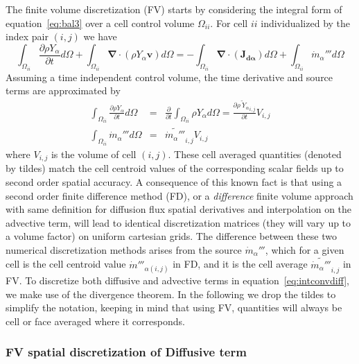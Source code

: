 \documentclass[12pt]{article}
\begin{document}
The finite volume discretization (FV) starts by considering the integral form of equation~\eqref{eq:bal3} over a cell control volume $\Omega_{ii}$. For
cell $ii$ individualized by the index pair $(i,j)$ we have
%
\begin{equation}
 \int_{\Omega_{ii}} {\frac{\partial \rho Y_\alpha}{\partial t}} d \Omega + \int_{\Omega_{ii}} { \boldsymbol{\nabla} \cdot  \left(  \rho Y_\alpha \mathbf{v} \right)
      } d \Omega  = -\int_{\Omega_{ii}} { \boldsymbol{\nabla} \cdot \left(  \mathbf{J_{d \alpha}}  \right)  } d \Omega + \int_{\Omega_{ii}} { \dot{m}_\alpha''' } d \Omega \label{eq:intconvdiff}
\end{equation}
%
Assuming a time independent control volume, the time derivative and source terms are approximated by
%
\begin{eqnarray}
  \int_{\Omega_{ii}} {\frac{\partial \rho Y_\alpha}{\partial t}} d \Omega & = & \frac{\partial}{\partial t} \int_{\Omega_{ii}} {\rho Y_\alpha} d \Omega
  = \frac{\partial \widetilde{\rho \: Y_\alpha }_{i,j}}{\partial t} V_{i,j} \\
  \int_{\Omega_{ii}} { \dot{m}_\alpha''' } d \Omega & = & \widetilde{ \dot{m}_\alpha''' }_{i,j} V_{i,j} \label{eq:intcons}
\end{eqnarray}
%
where $V_{i,j}$ is the volume of cell $(i,j)$. These cell averaged quantities (denoted by tildes) match the cell centroid values of the corresponding scalar fields up to second order spatial accuracy. A consequence of this known fact is that using a second order finite difference method (FD), or a \textit{difference} finite volume approach with same definition
 for diffusion flux spatial derivatives and interpolation on the advective term, will lead to identical discretization matrices (they will vary up to a volume factor) on uniform cartesian grids. The difference between these two numerical discretization methods arises from the source $\dot{m}_\alpha''' $, which for a given cell is the cell centroid value $\dot{m}'''_{\alpha (i,j)}$ in FD, and it is the cell average $ \widetilde{ \dot{m}_\alpha''' }_{i,j}$ in FV. To discretize both diffusive and advective terms in equation~\eqref{eq:intconvdiff}, we make use of the divergence theorem. In the following we drop the tildes to simplify the notation, keeping in mind that using FV, quantities will always be cell or face averaged where it corresponds.

\subsubsection*{FV spatial discretization of Diffusive term} \label{Sec:FVdiff}
\end{document}
